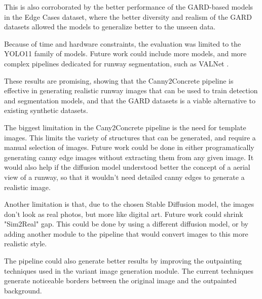 This is also corroborated by the better performance of the GARD-based models in
the Edge Cases dataset, where the better diversity and realism of the GARD
datasets allowed the models to generalize better to the unseen data.

Because of time and hardware constraints, the evaluation was limited to the
YOLO11 family of models. Future work could include more models, and more
complex pipelines dedicated for runway segmentation, such as VALNet
\cite{wang_valnet_2024}.

These results are promising, showing that the Canny2Concrete pipeline is
effective in generating realistic runway images that can be used to train
detection and segmentation models, and that the GARD datasets is a viable
alternative to existing synthetic datasets.

The biggest limitation in the Cany2Concrete pipeline is the need for template
images. This limits the variety of structures that can be generated, and require
a manual selection of images. Future work could be done in either
programatically generating canny edge images without extracting them from any
given image. It would also help if the diffusion model understood better the
concept of a aerial view of a runway, so that it wouldn't need detailed canny
edges to generate a realistic image.

Another limitation is that, due to the chosen Stable Diffusion model, the
images don't look as real photos, but more like digital art. Future work could
shrink "Sim2Real" gap. This could be done by using a different diffusion model,
or by adding another module to the pipeline that would convert images to this
more realistic style.

The pipeline could also generate better results by improving the outpainting
techniques used in the variant image generation module. The current techniques
generate noticeable borders between the original image and the outpainted
background.


